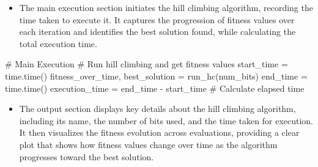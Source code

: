 \documentclass[
  letterpaper,
  DIV=11,
  numbers=noendperiod]{scrreprt}
\newenvironment{Shaded}{\begin{snugshade}}{\end{snugshade}}
\newcommand{\CommentTok}[1]{\textcolor[rgb]{0.37,0.37,0.37}{#1}}
\newcommand{\NormalTok}[1]{\textcolor[rgb]{0.00,0.23,0.31}{#1}}
\newcommand{\OperatorTok}[1]{\textcolor[rgb]{0.37,0.37,0.37}{#1}}
\providecommand{\tightlist}{%
  \setlength{\itemsep}{0pt}\setlength{\parskip}{0pt}}\usepackage{longtable,booktabs,array}
\begin{document}
\begin{itemize}
\tightlist
\item
  The main execution section initiates the hill climbing algorithm,
  recording the time taken to execute it. It captures the progression of
  fitness values over each iteration and identifies the best solution
  found, while calculating the total execution time.
\end{itemize}

\begin{Shaded}
\begin{Highlighting}[]
\CommentTok{\# Main Execution}
\CommentTok{\# Run hill climbing and get fitness values}
\NormalTok{start\_time }\OperatorTok{=}\NormalTok{ time.time()}
\NormalTok{fitness\_over\_time, best\_solution }\OperatorTok{=}\NormalTok{ run\_hc(num\_bits)}
\NormalTok{end\_time }\OperatorTok{=}\NormalTok{ time.time()}
\NormalTok{execution\_time }\OperatorTok{=}\NormalTok{ end\_time }\OperatorTok{{-}}\NormalTok{ start\_time  }\CommentTok{\# Calculate elapsed time}
\end{Highlighting}
\end{Shaded}

\begin{itemize}
\tightlist
\item
  The output section displays key details about the hill climbing
  algorithm, including its name, the number of bits used, and the time
  taken for execution. It then visualizes the fitness evolution across
  evaluations, providing a clear plot that shows how fitness values
  change over time as the algorithm progresses toward the best solution.
\end{itemize}
\end{document}
